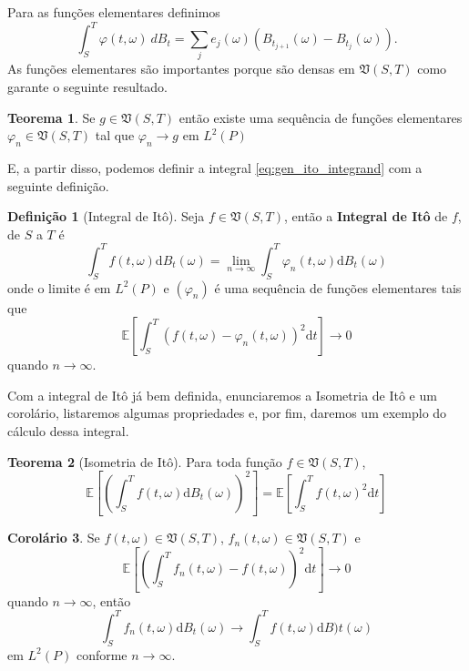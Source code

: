 \documentclass[12pt,a4paper]{article}
\theoremstyle{definition}
\newtheorem{theorem}{Teorema}
\newtheorem{corollary}[theorem]{Corolário}
\newtheorem{definition}{Definição}
\begin{document}
Para as funções elementares definimos 
\[
\int_S^T\varphi(t, \omega)~dB_t=\sum_{j}e_j(\omega)(B_{t_{j+1}}(\omega)-B_{t_j}(\omega)).
\]
As funções elementares são importantes porque são densas em $\mathfrak{V}(S,T)$ como garante o seguinte resultado.
\begin{theorem}
Se $g\in \mathfrak{V}(S,T)$  então existe uma sequência de funções elementares $\varphi_n\in \mathfrak{V}(S,T)$ tal que $\varphi_n\to g$ em $L^2(P)$
\end{theorem}

E, a partir disso, podemos definir a integral \eqref{eq:gen_ito_integrand} com a seguinte definição.

\begin{definition}[Integral de Itô]
	Seja $f \in \mathfrak{V}(S,T)$, então a \textbf{Integral de Itô} de $f$, de $S$ a $T$ é
	\begin{equation}
		\int_S^T f(t, \omega) \mathrm{d}B_t(\omega) = \lim_{n \to \infty} \int_S^T \varphi_n (t, \omega)  \mathrm{d}B_t(\omega)
	\end{equation}
	onde o limite é em $L^2(P)$ e $( \varphi_n )$ é uma sequência de funções elementares tais que
	\[
		\mathbb{E} \left[ \int_S^T (f(t, \omega) - \varphi_n(t, \omega))^2 \mathrm{d}t \right] \longrightarrow 0
	\] 
	quando $n \to \infty$.
\end{definition}

Com a integral de Itô já bem definida, enunciaremos a Isometria de Itô e um corolário, listaremos algumas propriedades e, por fim, daremos um exemplo do cálculo dessa integral.

\begin{theorem}[Isometria de Itô]
	Para toda função $f \in \mathfrak{V}(S,T)$,	
	\begin{equation}
		\mathbb{E}\left[\left( \int_S^T f(t,\omega) \mathrm{d}B_t(\omega) \right)^2 \right] = \mathbb{E} \left[\int_S^T f(t,\omega)^2 \mathrm{d}t \right]
	\end{equation}
\end{theorem}

\begin{corollary}\label{cr:ito}
	Se $f(t, \omega) \in \mathfrak{V}(S,T)$, $f_n(t, \omega) \in \mathfrak{V}(S,T)$ e
	\[
		\mathbb{E}\left[\left( \int_S^T f_n(t,\omega) - f(t, \omega) \right)^2 \mathrm{d}t \right] \longrightarrow 0
		\]
	quando $n \to \infty$, então
	\begin{equation}
		\int_S^T f_n(t, \omega) \mathrm{d}B_t(\omega) \longrightarrow \int_S^T f(t, \omega) \mathrm{d} B)t(\omega)
	\end{equation}
	em $L^2(P)$ conforme $n \to \infty$.
\end{corollary}
\end{document}
